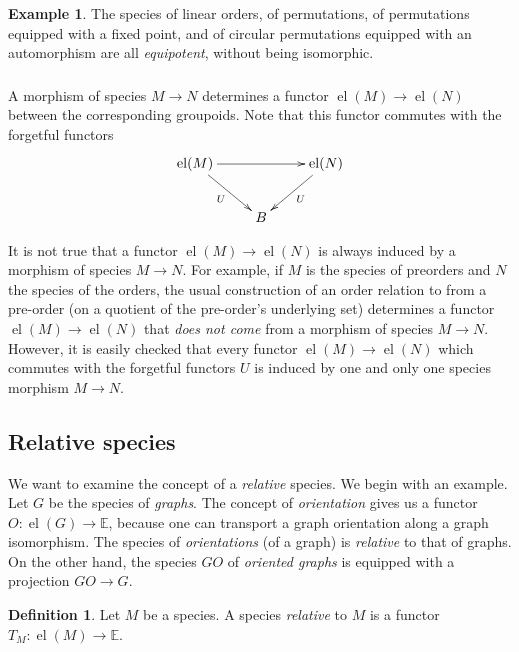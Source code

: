 \documentclass{article}
\theoremstyle{definition}
\newtheorem{defn}[thm]{Definition}
\newtheorem{ex}{Example}
\theoremstyle{remark}
\newcommand{\E}{\mathbb{E}}
\DeclareMathOperator{\el}{el}
\begin{document}
\begin{ex}
  The species of linear orders, of permutations, of permutations
  equipped with a fixed point, and of circular permutations equipped
  with an automorphism are all \emph{equipotent}, without being
  isomorphic.
\end{ex}

\subsubsection{} A morphism of species $M \to N$ determines a functor
$\el (M) \to \el (N)$ between the corresponding groupoids. Note that
this functor commutes with the forgetful functors \[ \xymatrix{\el(M)
  \ar[rr] \ar[dr]_U & & \el(N) \ar[dl]^U \\ & B} \] 

It is not true that a functor $\el (M) \to \el (N)$ is always induced
by a morphism of species $M \to N$. For example, if $M$ is the species
of preorders and $N$ the species of the orders, the usual construction
of an order relation to from a pre-order (on a quotient of the
pre-order's underlying set) determines a functor $\el (M) \to \el (N)$
that \emph{does not come} from a morphism of species $M \to
N$. However, it is easily checked that every functor $\el (M) \to \el
(N)$ which commutes with the forgetful functors $U$ is induced by one
and only one species morphism $M \to N$.

\subsection{Relative species}

We want to examine the concept of a \emph{relative} species. We begin
with an example. Let $G$ be the species of \emph{graphs}. The concept
of \emph{orientation} gives us a functor $O : \el (G) \to \E$, because
one can transport a graph orientation along a graph isomorphism. The
species of \emph{orientations} (of a graph) is \emph{relative} to that
of graphs. On the other hand, the species $GO$ of \emph{oriented
  graphs} is equipped with a projection $GO \to G$.

\begin{defn}
  Let $M$ be a species. A species \emph{relative} to $M$ is a functor
  $T_M : \el (M) \to \E$.
\end{defn}
\end{document}

